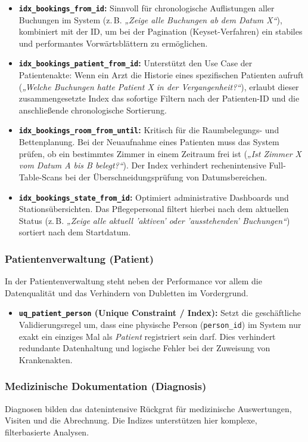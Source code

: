 \begin{itemize}
    \item \textbf{\texttt{idx\_bookings\_from\_id}:} Sinnvoll für chronologische Auflistungen aller Buchungen im System (z.\,B. \textit{„Zeige alle Buchungen ab dem Datum X“}), kombiniert mit der ID, um bei der Pagination (Keyset-Verfahren) ein stabiles und performantes Vorwärtsblättern zu ermöglichen.
    \item \textbf{\texttt{idx\_bookings\_patient\_from\_id}:} Unterstützt den Use Case der Patientenakte: Wenn ein Arzt die Historie eines spezifischen Patienten aufruft (\textit{„Welche Buchungen hatte Patient X in der Vergangenheit?“}), erlaubt dieser zusammengesetzte Index das sofortige Filtern nach der Patienten-ID und die anschließende chronologische Sortierung.
    \item \textbf{\texttt{idx\_bookings\_room\_from\_until}:} Kritisch für die Raumbelegungs- und Bettenplanung. Bei der Neuaufnahme eines Patienten muss das System prüfen, ob ein bestimmtes Zimmer in einem Zeitraum frei ist (\textit{„Ist Zimmer X vom Datum A bis B belegt?“}). Der Index verhindert rechenintensive Full-Table-Scans bei der Überschneidungsprüfung von Datumsbereichen.
    \item \textbf{\texttt{idx\_bookings\_state\_from\_id}:} Optimiert administrative Dashboards und Stationsübersichten. Das Pflegepersonal filtert hierbei nach dem aktuellen Status (z.\,B. \textit{„Zeige alle aktuell 'aktiven' oder 'ausstehenden' Buchungen“}) sortiert nach dem Startdatum.
\end{itemize}

\subsubsection{Patientenverwaltung (Patient)}
In der Patientenverwaltung steht neben der Performance vor allem die Datenqualität und das Verhindern von Dubletten im Vordergrund.

\begin{itemize}
    \item \textbf{\texttt{uq\_patient\_person} (Unique Constraint / Index):} Setzt die geschäftliche Validierungsregel um, dass eine physische Person (\texttt{person\_id}) im System nur exakt ein einziges Mal als \textit{Patient} registriert sein darf. Dies verhindert redundante Datenhaltung und logische Fehler bei der Zuweisung von Krankenakten.
\end{itemize}

\subsubsection{Medizinische Dokumentation (Diagnosis)}
Diagnosen bilden das datenintensive Rückgrat für medizinische Auswertungen, Visiten und die Abrechnung. Die Indizes unterstützen hier komplexe, filterbasierte Analysen.

